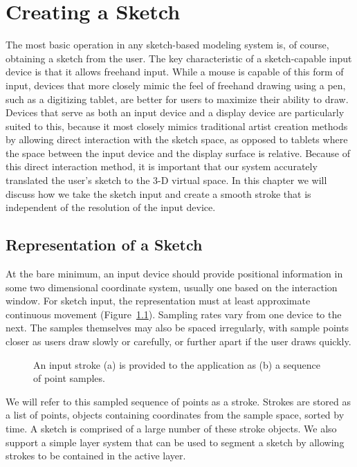 \chapter{Creating a Sketch}

The most basic operation in any sketch-based modeling system is, of course, obtaining a sketch from the user.
The key characteristic of a sketch-capable input device is that it allows freehand input.
While a mouse is capable of this form of input, devices that more closely mimic the feel of freehand drawing using a pen, such as a digitizing tablet, are better for users to maximize their ability to draw.
Devices that serve as both an input device and a display device are particularly suited to this, because it most closely mimics traditional artist creation methods by allowing direct interaction with the sketch space, as opposed to tablets where the space between the input device and the display surface is relative.
Because of this direct interaction method, it is important that our system accurately translated the user's sketch to the 3-D virtual space.
In this chapter we will discuss how we take the sketch input and create a smooth stroke that is independent of the resolution of the input device.

\section{Representation of a Sketch}

At the bare minimum, an input device should provide positional information in some two dimensional coordinate system, usually one based on the interaction window.
For sketch input, the representation must at least approximate continuous movement (Figure~\ref{fig:sampledata}).
Sampling rates vary from one device to the next.
The samples themselves may also be spaced irregularly, with sample points closer as users draw slowly or carefully, or further apart if the user draws quickly.

\begin{figure}
\label{fig:sampledata}
\caption{An input stroke (a) is provided to the application as (b) a sequence of point samples.}
\end{figure}

We will refer to this sampled sequence of points as a stroke. 
Strokes are stored as a list of points, objects containing coordinates from the sample space, sorted by time.
A sketch is comprised of a large number of these stroke objects.
We also support a simple layer system that can be used to segment a sketch by allowing strokes to be contained in the active layer.


